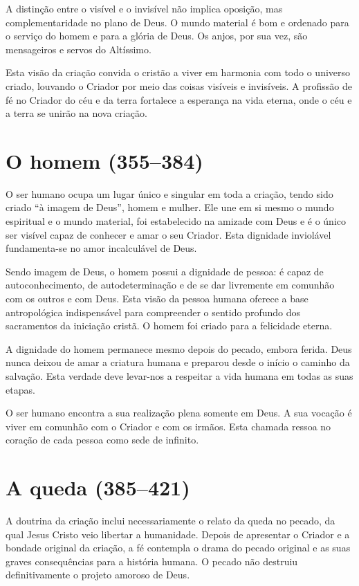 A distinção entre o visível e o invisível não implica oposição, mas complementaridade no plano de Deus. O mundo material é bom e ordenado para o serviço do homem e para a glória de Deus. Os anjos, por sua vez, são mensageiros e servos do Altíssimo.

Esta visão da criação convida o cristão a viver em harmonia com todo o universo criado, louvando o Criador por meio das coisas visíveis e invisíveis. A profissão de fé no Criador do céu e da terra fortalece a esperança na vida eterna, onde o céu e a terra se unirão na nova criação.

\section{O homem (355--384)}

O ser humano ocupa um lugar único e singular em toda a criação, tendo sido criado ``à imagem de Deus'', homem e mulher. Ele une em si mesmo o mundo espiritual e o mundo material, foi estabelecido na amizade com Deus e é o único ser visível capaz de conhecer e amar o seu Criador. Esta dignidade inviolável fundamenta-se no amor incalculável de Deus.

Sendo imagem de Deus, o homem possui a dignidade de pessoa: é capaz de autoconhecimento, de autodeterminação e de se dar livremente em comunhão com os outros e com Deus. Esta visão da pessoa humana oferece a base antropológica indispensável para compreender o sentido profundo dos sacramentos da iniciação cristã. O homem foi criado para a felicidade eterna.

A dignidade do homem permanece mesmo depois do pecado, embora ferida. Deus nunca deixou de amar a criatura humana e preparou desde o início o caminho da salvação. Esta verdade deve levar-nos a respeitar a vida humana em todas as suas etapas.

O ser humano encontra a sua realização plena somente em Deus. A sua vocação é viver em comunhão com o Criador e com os irmãos. Esta chamada ressoa no coração de cada pessoa como sede de infinito.

\section{A queda (385--421)}

A doutrina da criação inclui necessariamente o relato da queda no pecado, da qual Jesus Cristo veio libertar a humanidade. Depois de apresentar o Criador e a bondade original da criação, a fé contempla o drama do pecado original e as suas graves consequências para a história humana. O pecado não destruiu definitivamente o projeto amoroso de Deus.

